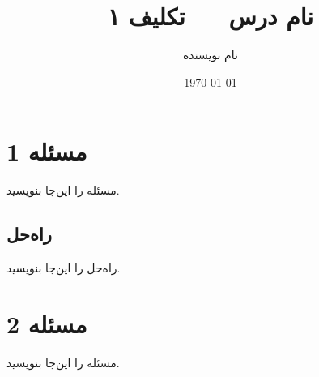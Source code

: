 \documentclass[11pt]{article}
\title{نام درس — تکلیف ۱}
\author{نام نویسنده}
\date{\today}
\begin{document}
\maketitle

\section*{مسئله 1}
مسئله را این‌جا بنویسید.

\subsection*{راه‌حل}
راه‌حل را این‌جا بنویسید.

\section*{مسئله 2}
مسئله را این‌جا بنویسید.
\end{document}
